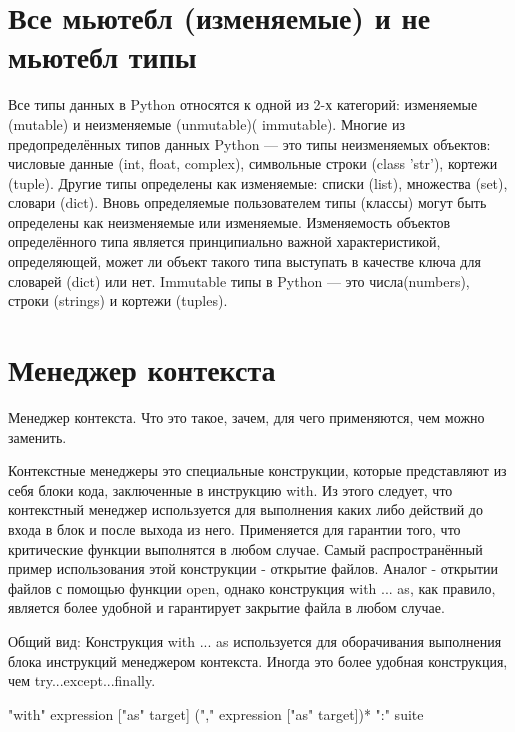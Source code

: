 \section{Все мьютебл (изменяемые) и не мьютебл типы}

Все типы данных в Python относятся к одной из 2-х категорий: изменяемые (mutable) и неизменяемые (unmutable)( immutable). Многие из предопределённых типов данных Python — это типы неизменяемых объектов: числовые данные (int, float, complex), символьные строки (class 'str'), кортежи (tuple). Другие типы определены как изменяемые: списки (list), множества (set), словари (dict). Вновь определяемые пользователем типы (классы) могут быть определены как неизменяемые или изменяемые. Изменяемость объектов определённого типа является принципиально важной характеристикой, определяющей, может ли объект такого типа выступать в качестве ключа для словарей (dict) или нет.
Immutable типы в Python — это числа(numbers), строки (strings) и кортежи (tuples).	

\section{Менеджер контекста}		

Менеджер контекста. Что это такое, зачем, для чего применяются, чем можно заменить. 

		Контекстные менеджеры это специальные конструкции, которые представляют из себя блоки кода, заключенные в инструкцию with. Из этого следует, что контекстный менеджер используется для выполнения каких либо действий до входа в блок и после выхода из него.  Применяется для гарантии того, что критические функции выполнятся в любом случае. Самый распространённый пример использования этой конструкции - открытие файлов. Аналог - открытии файлов с помощью функции open, однако конструкция with ... as, как правило, является более удобной и гарантирует закрытие файла в любом случае.
	
	Общий вид: Конструкция with ... as используется для оборачивания выполнения блока инструкций менеджером контекста. Иногда это более удобная конструкция, чем try...except...finally.
	\begin{python}
	"with" expression ["as" target] ("," expression ["as" target])* ":"
	    suite
	\end{python}
	
